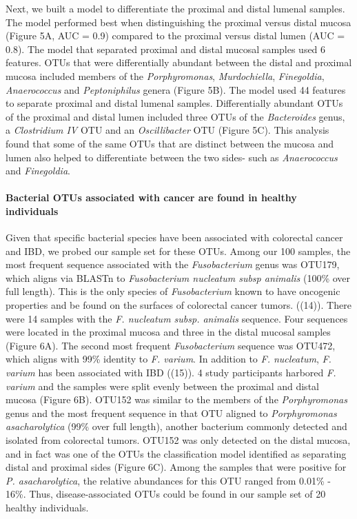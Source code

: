 \documentclass[11pt,]{article}
\let\oldparagraph\paragraph
\renewcommand{\paragraph}[1]{\oldparagraph{#1}\mbox{}}
\begin{document}
Next, we built a model to differentiate the proximal and distal lumenal
samples. The model performed best when distinguishing the proximal
versus distal mucosa (Figure 5A, AUC = 0.9) compared to the proximal
versus distal lumen (AUC = 0.8). The model that separated proximal and
distal mucosal samples used 6 features. OTUs that were differentially
abundant between the distal and proximal mucosa included members of the
\emph{Porphyromonas}, \emph{Murdochiella}, \emph{Finegoldia},
\emph{Anaerococcus} and \emph{Peptoniphilus} genera (Figure 5B). The
model used 44 features to separate proximal and distal lumenal samples.
Differentially abundant OTUs of the proximal and distal lumen included
three OTUs of the \emph{Bacteroides} genus, a \emph{Clostridium IV} OTU
and an \emph{Oscillibacter} OTU (Figure 5C). This analysis found that
some of the same OTUs that are distinct between the mucosa and lumen
also helped to differentiate between the two sides- such as
\emph{Anaerococcus} and \emph{Finegoldia}.

\paragraph{Bacterial OTUs associated with cancer are found in healthy
individuals}\label{bacterial-otus-associated-with-cancer-are-found-in-healthy-individuals}

Given that specific bacterial species have been associated with
colorectal cancer and IBD, we probed our sample set for these OTUs.
Among our 100 samples, the most frequent sequence associated with the
\emph{Fusobacterium} genus was OTU179, which aligns via BLASTn to
\emph{Fusobacterium nucleatum subsp animalis} (100\% over full length).
This is the only species of \emph{Fusobacterium} known to have oncogenic
properties and be found on the surfaces of colorectal cancer tumors.
((14)). There were 14 samples with the \emph{F. nucleatum subsp.
animalis} sequence. Four sequences were located in the proximal mucosa
and three in the distal mucosal samples (Figure 6A). The second most
frequent \emph{Fusobacterium} sequence was OTU472, which aligns with
99\% identity to \emph{F. varium}. In addition to \emph{F. nucleatum},
\emph{F. varium} has been associated with IBD ((15)). 4 study
participants harbored \emph{F. varium} and the samples were split evenly
between the proximal and distal mucosa (Figure 6B). OTU152 was similar
to the members of the \emph{Porphyromonas} genus and the most frequent
sequence in that OTU aligned to \emph{Porphyromonas asacharolytica}
(99\% over full length), another bacterium commonly detected and
isolated from colorectal tumors. OTU152 was only detected on the distal
mucosa, and in fact was one of the OTUs the classification model
identified as separating distal and proximal sides (Figure 6C). Among
the samples that were positive for \emph{P. asacharolytica}, the
relative abundances for this OTU ranged from 0.01\% - 16\%. Thus,
disease-associated OTUs could be found in our sample set of 20 healthy
individuals.
\end{document}
